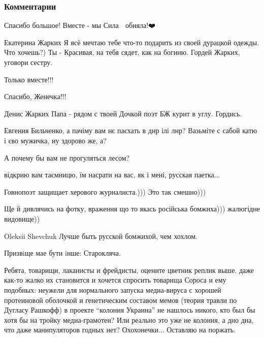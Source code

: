  
 
 
 
 
\subsubsection{Комментарии}
\label{sec:21_06_2020.fb.bilchenko_evgenia.1.zhurnalisty.cmt}
\begin{itemize}


Спасибо большое! Вместе - мы Сила 💪 обняла!❤️


Екатерина Жарких Я всё мечтаю тебе что-то подарить из своей дурацкой одежды.
Что хочешь?) Ты - Красивая, на тебя сядет, как на богиню. Гордей Жарких,
уговори сестру.


Только вместе!!!

Спасибо, Женечка!!!

Денис Жарких Папа - рядом с твоей Дочкой поэт БЖ курит в углу. Гордись.

Евгения Бильченко, а пачіму вам нє паєхать в днр ілі лнр? Вазьміте с сабой катю і єво мужичка, ну здорово же, а?

А почему бы вам не прогуляться лесом?

відкрию вам таємницю, їм насрати на вас, як і мені, русская паетка...

Говнопоэт защищает херового журналиста.))) Это так смешно)))

Ще й дивлячись на фотку, враження що то якась російська бомжиха))) жалюгідне видовище))

Oleksii Shevchuk Лучше быть русской бомжихой, чем хохлом.

Призвiще мае бути iнше: Старокляча.


Ребята, товарищи, лаканисты и фрейдисты, оцените цветник реплик выше. даже
как-то жалко их становится и хочется спросить товарища Сороса и ему подобных:
неужели для нормального запуска медиа-вируса с хорошей протеиновой оболочкой и
генетическим составом мемов (теория травли по Дугласу Рашкофф) в проекте
\enquote{колония Украина} не нашлось никого, кто был бы хотя бы на тройку
медиа-грамотен? Или реально это уже не колония, а дно дна, что даже
манипуляторов годных нет? Охохонечки... Оставляю на поржать.


\end{itemize}
